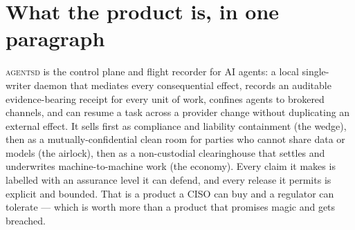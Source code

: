 \documentclass[11pt,a4paper]{article}
\begin{document}
\section{What the product is, in one paragraph}
\textsc{agentsd} is the control plane and flight recorder for AI agents: a local single-writer daemon that mediates every consequential effect, records an auditable evidence-bearing receipt for every unit of work, confines agents to brokered channels, and can resume a task across a provider change without duplicating an external effect. It sells first as compliance and liability containment (the wedge), then as a mutually-confidential clean room for parties who cannot share data or models (the airlock), then as a non-custodial clearinghouse that settles and underwrites machine-to-machine work (the economy). Every claim it makes is labelled with an assurance level it can defend, and every release it permits is explicit and bounded. That is a product a CISO can buy and a regulator can tolerate --- which is worth more than a product that promises magic and gets breached.
\end{document}
